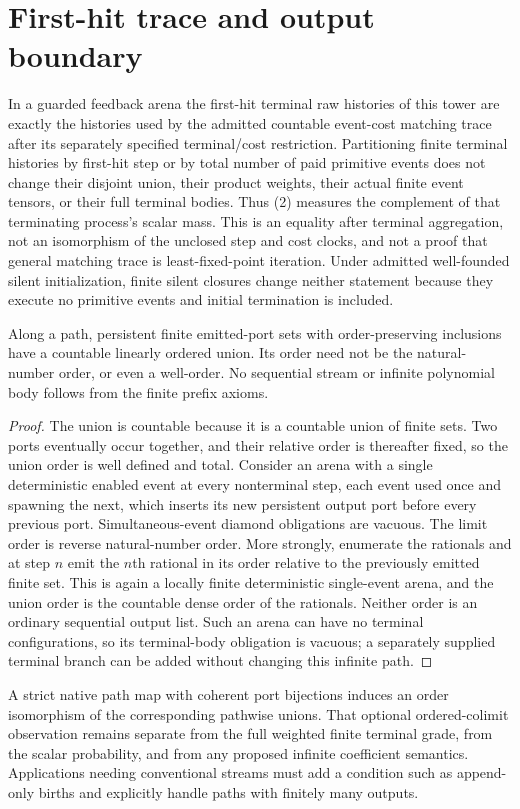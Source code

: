 \documentclass[11pt]{article}
\begin{document}
\section{First-hit trace and output boundary}
In a guarded feedback arena the first-hit terminal raw histories of this tower are exactly the histories used by the admitted countable event-cost matching trace after its separately specified terminal/cost restriction. Partitioning finite terminal histories by first-hit step or by total number of paid primitive events does not change their disjoint union, their product weights, their actual finite event tensors, or their full terminal bodies. Thus (2) measures the complement of that terminating process's scalar mass. This is an equality after terminal aggregation, not an isomorphism of the unclosed step and cost clocks, and not a proof that general matching trace is least-fixed-point iteration. Under admitted well-founded silent initialization, finite silent closures change neither statement because they execute no primitive events and initial termination is included.

\begin{proposition}
Along a path, persistent finite emitted-port sets with order-preserving inclusions have a countable linearly ordered union. Its order need not be the natural-number order, or even a well-order. No sequential stream or infinite polynomial body follows from the finite prefix axioms.
\end{proposition}
\begin{proof}
The union is countable because it is a countable union of finite sets. Two ports eventually occur together, and their relative order is thereafter fixed, so the union order is well defined and total. Consider an arena with a single deterministic enabled event at every nonterminal step, each event used once and spawning the next, which inserts its new persistent output port before every previous port. Simultaneous-event diamond obligations are vacuous. The limit order is reverse natural-number order. More strongly, enumerate the rationals and at step $n$ emit the $n$th rational in its order relative to the previously emitted finite set. This is again a locally finite deterministic single-event arena, and the union order is the countable dense order of the rationals. Neither order is an ordinary sequential output list. Such an arena can have no terminal configurations, so its terminal-body obligation is vacuous; a separately supplied terminal branch can be added without changing this infinite path.
\end{proof}
A strict native path map with coherent port bijections induces an order isomorphism of the corresponding pathwise unions. That optional ordered-colimit observation remains separate from the full weighted finite terminal grade, from the scalar probability, and from any proposed infinite coefficient semantics. Applications needing conventional streams must add a condition such as append-only births and explicitly handle paths with finitely many outputs.
\end{document}
